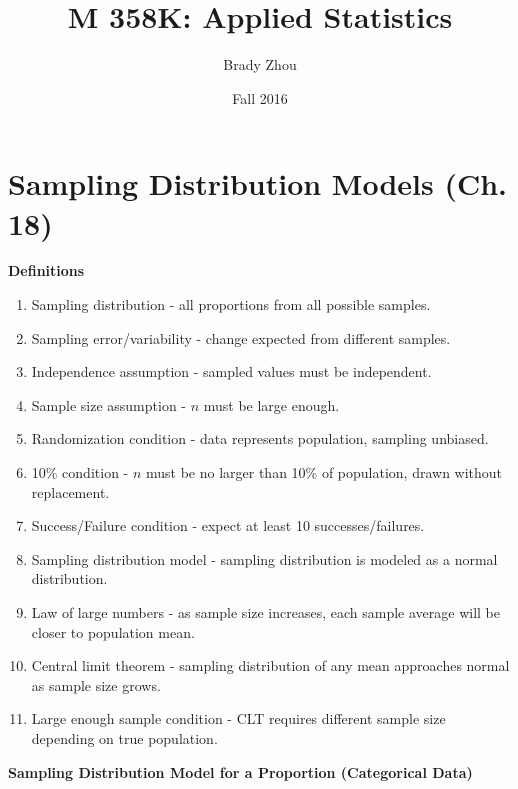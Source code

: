 \documentclass{article}
\title{M 358K: Applied Statistics}
\author{Brady Zhou}
\date{Fall 2016}
\theoremstyle{definition}
\begin{document}
\maketitle

\section{Sampling Distribution Models (Ch. 18)}

\textbf{Definitions}

\begin{enumerate}[label=\textbf{\roman*.}]
    \item Sampling distribution - all proportions from all possible samples.

    \item Sampling error/variability - change expected from different samples.

    \item Independence assumption - sampled values must be independent.

    \item Sample size assumption - $n$ must be large enough.

    \item Randomization condition - data represents population, sampling unbiased.

    \item 10\% condition - $n$ must be no larger than 10\% of population, drawn without replacement.

    \item Success/Failure condition - expect at least 10 successes/failures.

    \item Sampling distribution model - sampling distribution is modeled as a normal distribution.

    \item Law of large numbers - as sample size increases, each sample average will be closer to population mean.

    \item Central limit theorem - sampling distribution of any mean approaches normal as sample size grows.

    \item Large enough sample condition - CLT requires different sample size depending on true population.
\end{enumerate}

\vspace{2ex}
\textbf{Sampling Distribution Model for a Proportion (Categorical Data)}
\end{document}
